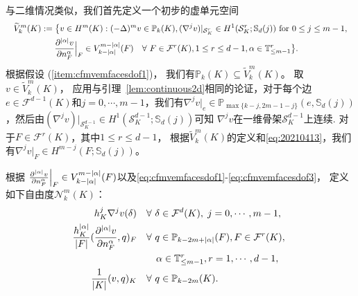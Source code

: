 与二维情况类似，我们首先定义一个初步的虚单元空间
$$
\resizebox{\textwidth}{!}{$
 \begin{aligned}
\widetilde{V}_k^m(K)&:=\big\{ v\in H^m(K):  (-\Delta)^mv\in \mathbb P_{k}(K),  (\nabla^jv)|_{\mathcal S_K^r}\in H^1(\mathcal S_K^r;\mathbb S_{d}(j)) \textrm{ for } 0\leq j\leq m-1, \\
&\quad\;\;\frac{\partial^{|\alpha|}v}{\partial \nnn_F^{\alpha}}\Big|_F\in
V_{k-|\alpha|}^{m-|\alpha|}(F)\quad\forall~F\in\mathcal F^{r}(K), 1\leq r\leq
d-1, \alpha\in \mathbb{T}^r_{\leq m-1}\big\}.
\end{aligned}
$}
$$
根据假设 (\ref{item:cfmvemfacesdof1})，
我们有$\mathbb P_k(K)\subseteq\widetilde{V}_k^m(K)$。
取$v\in\widetilde{V}_k^m(K)$，
应用与引理~\ref{lem:continuous2d}相同的论证，对于每个边$e\in\mathcal F^{d-1}(K)$和$j=0,\cdots, m-1$，我们有$\nabla^jv|_e\in\mathbb P_{\max\{k-j, 2m-1-j\}}(e,\mathbb S_d(j))$，然后由$(\nabla^jv)|_{\mathcal S_K^{d-1}}\in H^1(\mathcal S_K^{d-1};\mathbb S_{d}(j))$可知
$\nabla^jv$在一维骨架$\mathcal S_K^{d-1}$上连续.
对于$F\in\mathcal{F}^r(K)$，其中$1\leq r\leq d-1$，
根据$\widetilde{V}_k^m(K)$的定义和\eqref{eq:20210413}，我们有$\nabla^jv|_F\in H^{m-j}(F; \mathbb S_{d}(j))$。

根据 $\frac{\partial^{|\alpha|}v}{\partial n_F^{\alpha}}\Big|_F\in
V_{k-|\alpha|}^{m-|\alpha|}(F)$以及\eqref{eq:cfmvemfacesdof1}-\eqref{eq:cfmvemfacesdof3}，
定义如下自由度$\mathcal N_k^m(K)$：
\begin{align}
h_K^j\nabla^{j}v(\delta) & \quad\forall~\delta\in\mathcal F^{d}(K), \;j=0,\cdots,m-1, \label{eq:cfmvemdof1}\\
\frac{h_K^{|\alpha|}}{|F|}(\frac{\partial^{|\alpha|}v}{\partial n_F^{\alpha}}, q)_F & \quad\forall~q\in\mathbb P_{k-2m+|\alpha|}(F), F\in\mathcal F^{r}(K), \; \label{eq:cfmvemdof2}\\
&\quad \quad \alpha\in \mathbb{T}^r_{\leq m-1}, r=1,\cdots,d-1,\notag\\
\frac{1}{|K|}(v, q)_K & \quad\forall~q\in\mathbb P_{k-2m}(K). \label{eq:cfmvemdof3}
\end{align}

